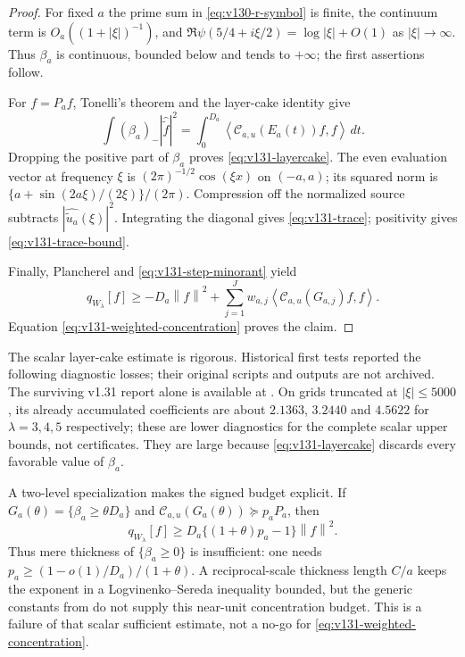 \documentclass[11pt]{article}
\theoremstyle{remark}
\newcommand{\norm}[1]{\left\lVert #1\right\rVert}
\newcommand{\ip}[2]{\left\langle #1,#2\right\rangle}
\begin{document}
\begin{proof}
For fixed $a$ the prime sum in \eqref{eq:v130-r-symbol} is finite, the
continuum term is $O_a((1+|\xi|)^{-1})$, and
$\Re\psi(5/4+i\xi/2)=\log|\xi|+O(1)$ as $|\xi|\to\infty$.
Thus $\beta_a$ is continuous, bounded below and tends to $+\infty$;
the first assertions follow.

For $f=P_af$, Tonelli's theorem and the layer-cake identity give
\[
 \int(\beta_a)_-|\widehat{\widetilde f}|^2
 =\int_0^{D_a}\ip{\mathcal C_{a,u}(E_a(t))f}f\,dt.
\]
Dropping the positive part of $\beta_a$ proves
\eqref{eq:v131-layercake}.  The even evaluation vector at frequency
$\xi$ is $(2\pi)^{-1/2}\cos(\xi x)$ on $(-a,a)$; its squared norm is
$\{a+\sin(2a\xi)/(2\xi)\}/(2\pi)$.  Compression off the normalized
source subtracts $|\widehat{\widetilde u_a}(\xi)|^2$.  Integrating the
diagonal gives \eqref{eq:v131-trace}; positivity gives
\eqref{eq:v131-trace-bound}.

Finally, Plancherel and \eqref{eq:v131-step-minorant} yield
\[
 q_{W_\lambda}[f]
 \ge -D_a\norm f^2+
       \sum_{j=1}^Jw_{a,j}\ip{\mathcal C_{a,u}(G_{a,j})f}f.
\]
Equation \eqref{eq:v131-weighted-concentration} proves the claim.
\end{proof}

The scalar layer-cake estimate is rigorous. Historical first tests
reported the following diagnostic losses; their original scripts and
outputs are not archived. The surviving v1.31 report alone is available
at .  On grids truncated at $|\xi|\le5000$, its already accumulated
coefficients are about $2.1363$, $3.2440$ and $4.5622$ for
$\lambda=3,4,5$ respectively; these are lower diagnostics for the
complete scalar upper bounds, not certificates.  They are large
because \eqref{eq:v131-layercake} discards every favorable value of
$\beta_a$.

A two-level specialization makes the signed budget explicit.  If
$G_a(\theta)=\{\beta_a\ge\theta D_a\}$ and
$\mathcal C_{a,u}(G_a(\theta))\succeq p_aP_a$, then
\begin{equation}\label{eq:v131-two-level}
 q_{W_\lambda}[f]
 \ge D_a\{(1+\theta)p_a-1\}\norm f^2.
\end{equation}
Thus mere thickness of $\{\beta_a\ge0\}$ is insufficient: one needs
$p_a\ge(1-o(1)/D_a)/(1+\theta)$.  A reciprocal-scale thickness
length $C/a$ keeps the exponent in a Logvinenko--Sereda inequality
bounded, but the generic constants from
\cite{Kovrijkine2000} do not supply this near-unit concentration
budget.  This is a failure of that scalar sufficient estimate, not a
no-go for \eqref{eq:v131-weighted-concentration}.
\end{document}
